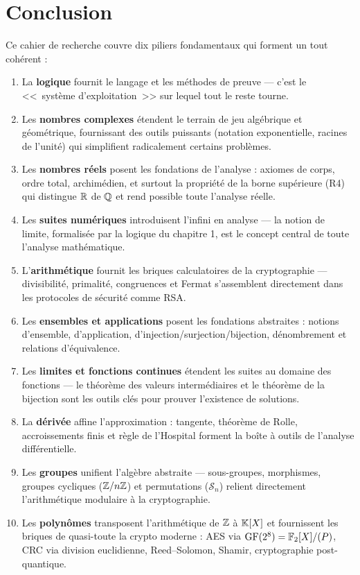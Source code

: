 \chapter*{Conclusion}

Ce cahier de recherche couvre dix piliers fondamentaux qui forment un tout cohérent :

\begin{enumerate}[leftmargin=2cm]
  \item La \textbf{logique} fournit le langage et les méthodes de preuve --- c'est le <<~système d'exploitation~>> sur lequel tout le reste tourne.
  \item Les \textbf{nombres complexes} étendent le terrain de jeu algébrique et géométrique, fournissant des outils puissants (notation exponentielle, racines de l'unité) qui simplifient radicalement certains problèmes.
  \item Les \textbf{nombres réels} posent les fondations de l'analyse : axiomes de corps, ordre total, archimédien, et surtout la propriété de la borne supérieure (R4) qui distingue $\mathbb{R}$ de $\mathbb{Q}$ et rend possible toute l'analyse réelle.
  \item Les \textbf{suites numériques} introduisent l'infini en analyse --- la notion de limite, formalisée par la logique du chapitre 1, est le concept central de toute l'analyse mathématique.
  \item L'\textbf{arithmétique} fournit les briques calculatoires de la cryptographie --- divisibilité, primalité, congruences et Fermat s'assemblent directement dans les protocoles de sécurité comme RSA.
  \item Les \textbf{ensembles et applications} posent les fondations abstraites : notions d'ensemble, d'application, d'injection/surjection/bijection, dénombrement et relations d'équivalence.
  \item Les \textbf{limites et fonctions continues} étendent les suites au domaine des fonctions --- le théorème des valeurs intermédiaires et le théorème de la bijection sont les outils clés pour prouver l'existence de solutions.
  \item La \textbf{dérivée} affine l'approximation : tangente, théorème de Rolle, accroissements finis et règle de l'Hospital forment la boîte à outils de l'analyse différentielle.
  \item Les \textbf{groupes} unifient l'algèbre abstraite --- sous-groupes, morphismes, groupes cycliques ($\mathbb{Z}/n\mathbb{Z}$) et permutations ($\mathcal{S}_n$) relient directement l'arithmétique modulaire à la cryptographie.
  \item Les \textbf{polynômes} transposent l'arithmétique de $\mathbb{Z}$ à $\mathbb{K}[X]$ et fournissent les briques de quasi-toute la crypto moderne : AES via $\mathrm{GF}(2^8) = \mathbb{F}_2[X]/(P)$, CRC via division euclidienne, Reed--Solomon, Shamir, cryptographie post-quantique.
\end{enumerate}

